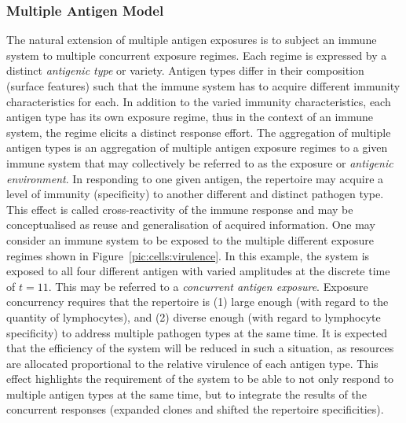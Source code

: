 \subsubsection{Multiple Antigen Model}
The natural extension of multiple antigen exposures is to subject an immune system to multiple concurrent exposure regimes. Each regime is expressed by a distinct \emph{antigenic type} or variety. Antigen types differ in their composition (surface features) such that the immune system has to acquire different immunity characteristics for each. In addition to the varied immunity characteristics, each antigen type has its own exposure regime, thus in the context of an immune system, the regime elicits a distinct response effort. The aggregation of multiple antigen types is an aggregation of multiple antigen exposure regimes to a given immune system that may collectively be referred to as the exposure or \emph{antigenic environment}. In responding to one given antigen, the repertoire may acquire a level of immunity (specificity) to another different and distinct pathogen type. This effect is called cross-reactivity of the immune response and may be conceptualised as reuse and generalisation of acquired information. One may consider an immune system to be exposed to the multiple different exposure regimes shown in Figure~\ref{pic:cells:virulence}. In this example, the system is exposed to all four different antigen with varied amplitudes at the discrete time of $t=11$. This may be referred to a \emph{concurrent antigen exposure}. Exposure concurrency requires that the repertoire is (1) large enough (with regard to the quantity of lymphocytes), and (2) diverse enough (with regard to lymphocyte specificity) to address multiple pathogen types at the same time. It is expected that the efficiency of the system will be reduced in such a situation, as resources are allocated proportional to the relative virulence of each antigen type. This effect highlights the requirement of the system to be able to not only respond to multiple antigen types at the same time, but to integrate the results of the concurrent responses (expanded clones and shifted the repertoire specificities).

